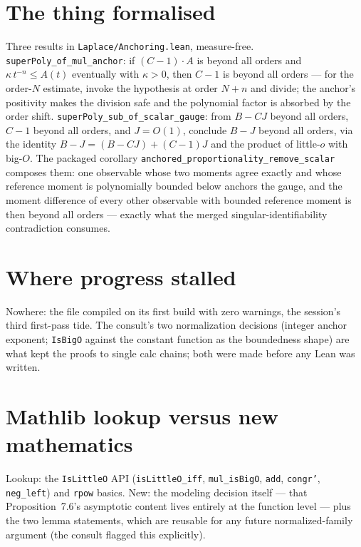 \documentclass[11pt]{article}
\newcommand{\code}[1]{\texttt{#1}}
\begin{document}
\section{The thing formalised}

Three results in \code{Laplace/Anchoring.lean}, measure-free.
\code{superPoly\_of\_mul\_anchor}: if $(C - 1) \cdot A$ is beyond all
orders and $\kappa\, t^{-n} \le A(t)$ eventually with $\kappa > 0$,
then $C - 1$ is beyond all orders --- for the order-$N$ estimate,
invoke the hypothesis at order $N + n$ and divide; the anchor's
positivity makes the division safe and the polynomial factor is
absorbed by the order shift. \code{superPoly\_sub\_of\_scalar\_gauge}:
from $B - CJ$ beyond all orders, $C - 1$ beyond all orders, and
$J = O(1)$, conclude $B - J$ beyond all orders, via the identity
$B - J = (B - CJ) + (C-1)J$ and the product of little-$o$ with
big-$O$. The packaged corollary
\code{anchored\_proportionality\_remove\_scalar} composes them: one
observable whose two moments agree exactly and whose reference
moment is polynomially bounded below anchors the gauge, and the
moment difference of every other observable with bounded reference
moment is then beyond all orders --- exactly what the merged
singular-identifiability contradiction consumes.

\section{Where progress stalled}

Nowhere: the file compiled on its first build with zero warnings,
the session's third first-pass tide. The consult's two normalization
decisions (integer anchor exponent; \code{IsBigO} against the
constant function as the boundedness shape) are what kept the proofs
to single calc chains; both were made before any Lean was written.

\section{Mathlib lookup versus new mathematics}

Lookup: the \code{IsLittleO} API (\code{isLittleO\_iff},
\code{mul\_isBigO}, \code{add}, \code{congr'}, \code{neg\_left}) and
\code{rpow} basics. New: the modeling decision itself --- that
Proposition~7.6's asymptotic content lives entirely at the function
level --- plus the two lemma statements, which are reusable for any
future normalized-family argument (the consult flagged this
explicitly).
\end{document}
